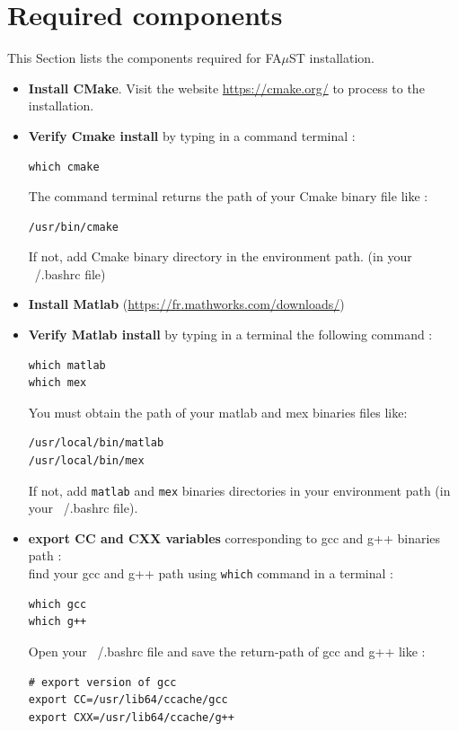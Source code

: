 \section{Required components}\label{sec:RequiredTools}
This Section lists the components required for FA$\mu$ST installation. 
\begin{itemize}
\item \textbf{Install CMake}. Visit the website \url{https://cmake.org/} to process to the installation.
\item \textbf{Verify Cmake install} by typing in a command terminal : 
\begin{lstlisting}
which cmake
\end{lstlisting}
The command terminal returns the path of your Cmake binary file like :
\begin{lstlisting}
/usr/bin/cmake
\end{lstlisting}
If not, add Cmake binary directory in the environment path. (in your ~/.bashrc file)

\item \textbf{Install Matlab} (\url{https://fr.mathworks.com/downloads/})

\item \textbf{Verify Matlab install} by typing in a terminal the following command : 
\begin{lstlisting}
which matlab
which mex
\end{lstlisting}
You must obtain the path of your matlab and mex binaries files like: 
\begin{lstlisting}
/usr/local/bin/matlab
/usr/local/bin/mex
\end{lstlisting}
If not, add \texttt{matlab} and \texttt{mex} binaries directories in your environment path (in your ~/.bashrc file). 

\item \textbf{export CC and CXX variables} corresponding to gcc and g++ binaries path :\\
find your gcc and g++ path using \texttt{which} command in a terminal :
\begin{lstlisting}
which gcc
which g++
\end{lstlisting}

Open your ~/.bashrc file and save the return-path of gcc and g++ like : \\
\begin{lstlisting}
# export version of gcc
export CC=/usr/lib64/ccache/gcc
export CXX=/usr/lib64/ccache/g++
\end{lstlisting}
\end{itemize}



